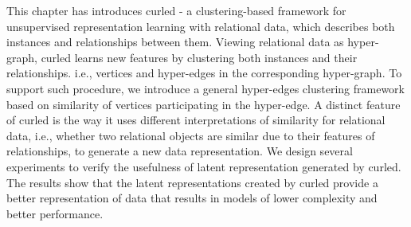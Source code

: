 This chapter has introduces \gls{curled} - a clustering-based framework for unsupervised representation learning with relational data, which describes both instances and relationships between them.
Viewing relational data as hyper-graph, \gls{curled} learns new features by clustering both instances and their relationships. i.e., vertices and hyper-edges in the corresponding hyper-graph.
To support such procedure, we introduce a general hyper-edges clustering framework based on similarity of vertices participating in the hyper-edge.
A distinct feature of \gls{curled} is the way it uses different interpretations of similarity for relational data, i.e., whether two relational objects are similar due to their features of relationships, to generate a new data representation.
We design several experiments to verify the usefulness of latent representation generated by \gls{curled}.
The results show that the latent representations created by \gls{curled} provide a better representation of data that results in models of lower complexity and better performance.




\cleardoublepage

